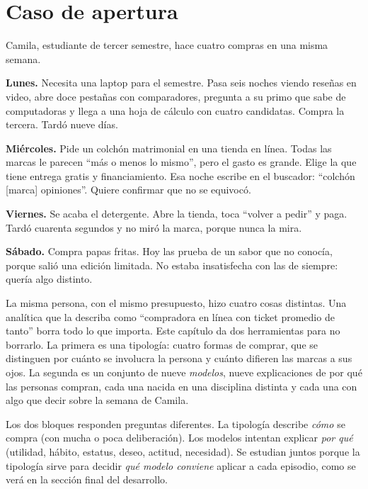 \section{Caso de apertura}

\begin{casoFicticio}
Camila, estudiante de tercer semestre, hace cuatro compras en una misma semana.

\textbf{Lunes.} Necesita una laptop para el semestre. Pasa seis noches viendo
reseñas en video, abre doce pestañas con comparadores, pregunta a su primo que
sabe de computadoras y llega a una hoja de cálculo con cuatro candidatas.
Compra la tercera. Tardó nueve días.

\textbf{Miércoles.} Pide un colchón matrimonial en una tienda en línea. Todas las
marcas le parecen \enquote{más o menos lo mismo}, pero el gasto es grande. Elige
la que tiene entrega gratis y financiamiento. Esa noche escribe en el buscador:
\enquote{colchón [marca] opiniones}. Quiere confirmar que no se equivocó.

\textbf{Viernes.} Se acaba el detergente. Abre la tienda, toca
\enquote{volver a pedir} y paga. Tardó cuarenta segundos y no miró la
marca, porque nunca la mira.

\textbf{Sábado.} Compra papas fritas. Hoy las prueba de un sabor que no
conocía, porque salió una edición limitada. No estaba insatisfecha con las de
siempre: quería algo distinto.
\end{casoFicticio}

La misma persona, con el mismo presupuesto, hizo cuatro cosas distintas. Una
analítica que la describa como \enquote{compradora en línea con ticket
promedio de tanto} borra todo lo que importa. Este capítulo da dos
herramientas para no borrarlo. La primera es una tipología: cuatro formas de
comprar, que se distinguen por cuánto se involucra la persona y cuánto
difieren las marcas a sus ojos. La segunda es un conjunto de nueve
\emph{modelos}, nueve explicaciones de por qué las personas compran, cada una
nacida en una disciplina distinta y cada una con algo que decir sobre la semana
de Camila.

Los dos bloques responden preguntas diferentes. La tipología describe
\emph{cómo} se compra (con mucha o poca deliberación). Los modelos intentan
explicar \emph{por qué} (utilidad, hábito, estatus, deseo, actitud, necesidad).
Se estudian juntos porque la tipología sirve para decidir \emph{qué modelo
conviene} aplicar a cada episodio, como se verá en la sección final del
desarrollo.

